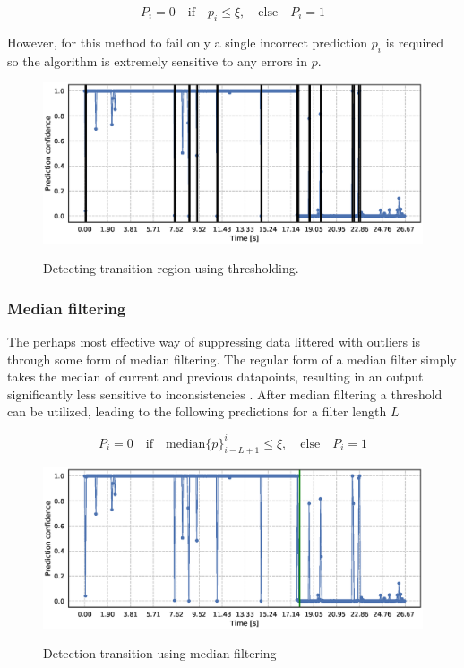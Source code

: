 \begin{equation}
	P_i=0 \quad\text{if}\quad p_i\leq\xi, \quad
	\text{else} \quad P_i=1
\end{equation}

However, for this method to fail only a single incorrect prediction $p_i$ is required so the algorithm is extremely sensitive to any errors in $p$.

\begin{figure}
	\includegraphics[scale=0.5]{figs_temp/detect_thresh}
	\label{fig:detect_thresh}
	\caption{Detecting transition region using thresholding.}
\end{figure}

\subsubsection{Median filtering}

The perhaps most effective way of suppressing data littered with outliers is through some form of median filtering. The regular form of a median filter simply takes the median of current and previous datapoints, resulting in an output significantly less sensitive to inconsistencies \citep{pearson_2002}. After median filtering a threshold can be utilized, leading to the following predictions for a filter length $L$

\begin{equation}
	P_i=0 \quad\text{if}\quad\text{median}\{p\}_{i-L+1}^i\leq\xi, 
	\quad \text{else} \quad P_i = 1
\end{equation}

\begin{figure}
	\includegraphics[scale=0.5]{figs_temp/detect_median}
	\label{fig:detect_median}
	\caption{Detection transition using median filtering}
\end{figure}

